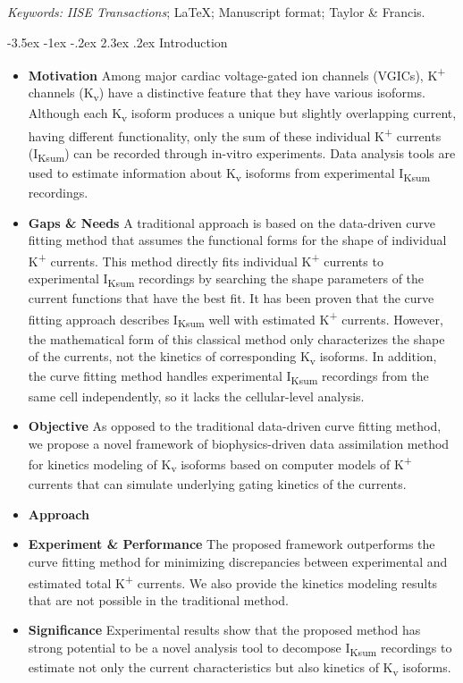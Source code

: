 \documentclass[11pt]{article}
\makeatletter
\renewcommand\section{\@startsection {section}{1}{\z@}%
                                   {-3.5ex \@plus -1ex \@minus -.2ex}%
                                   {2.3ex \@plus.2ex}%
                                   {\normalfont\fontfamily{phv}\fontsize{16}{19}\bfseries}}
\makeatother
\begin{document}
\noindent%
{\it Keywords:} \emph{IISE Transactions}; \LaTeX; Manuscript format; Taylor \& Francis.

{} %


\section{Introduction} \label{s:intro}
\begin{itemize}
    \item \textbf{Motivation} Among major cardiac voltage-gated ion channels (VGICs), K\textsuperscript{+} channels (K\textsubscript{v}) have a distinctive feature that they have various isoforms. Although each K\textsubscript{v} isoform produces a unique but slightly overlapping current, having different functionality, only the sum of these individual K\textsuperscript{+} currents (I\textsubscript{Ksum}) can be recorded through in-vitro experiments. Data analysis tools are used to estimate information about K\textsubscript{v} isoforms from experimental I\textsubscript{Ksum} recordings.
    \item \textbf{Gaps \& Needs} A traditional approach is based on the data-driven curve fitting method that assumes the functional forms for the shape of individual K\textsuperscript{+} currents. This method directly fits individual K\textsuperscript{+} currents to experimental I\textsubscript{Ksum} recordings by searching the shape parameters of the current functions that have the best fit. It has been proven that the curve fitting approach describes I\textsubscript{Ksum} well with estimated K\textsuperscript{+} currents. However, the mathematical form of this classical method only characterizes the shape of the currents, not the kinetics of corresponding K\textsubscript{v} isoforms. In addition, the curve fitting method handles experimental I\textsubscript{Ksum} recordings from the same cell independently, so it lacks the cellular-level analysis.
    \item \textbf{Objective} As opposed to the traditional data-driven curve fitting method, we propose a novel framework of biophysics-driven data assimilation method for kinetics modeling of K\textsubscript{v} isoforms based on computer models of K\textsuperscript{+} currents that can simulate underlying gating kinetics of the currents.
    \item \textbf{Approach} 
    \item \textbf{Experiment \& Performance} The proposed framework outperforms the curve fitting method for minimizing discrepancies between experimental and estimated total K\textsuperscript{+} currents. We also provide the kinetics modeling results that are not possible in the traditional method.
    \item \textbf{Significance} Experimental results show that the proposed method has strong potential to be a novel analysis tool to decompose I\textsubscript{Ksum} recordings to estimate not only the current characteristics but also kinetics of K\textsubscript{v} isoforms.
\end{itemize}
\end{document}
